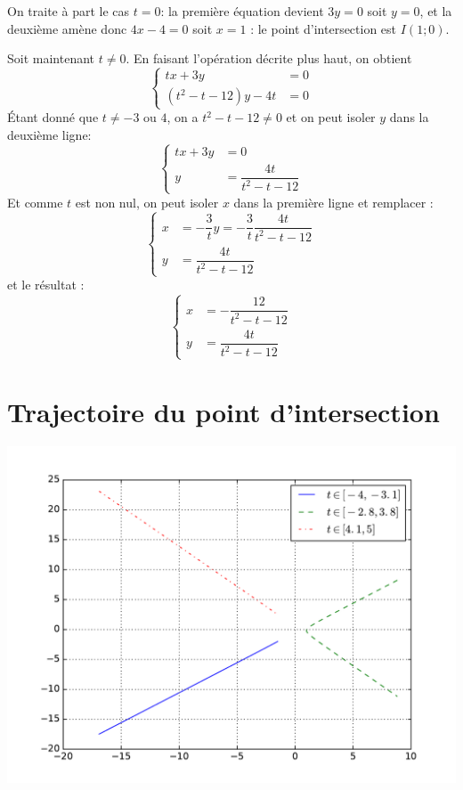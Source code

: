 \documentclass{article}
\theoremstyle{definition}
\begin{document}
\begin{enumerate}[label=\arabic*., listparindent=1.5em, labelsep=2em, itemindent=1.5em]
On traite à part le cas $t=0$: la première équation devient $3y=0$ soit $y=0$, et la deuxième amène donc $4x-4=0$ soit $x=1$ : le point d'intersection est $I(1;0)$.

Soit maintenant $t\neq 0$. En faisant l'opération décrite plus haut, on obtient
	\[\left\{\begin{array}{lc}
    tx+3y &= 0 \\
    (t^2-t-12)y-4t &= 0
    \end{array}\right.
    \]
	Étant donné que $t\neq -3\textrm{ ou }4$, on a $t^2-t-12\neq 0$ et on peut isoler $y$ dans la deuxième ligne:
    \[\left\{\begin{array}{lc}
    tx+3y &= 0 \\
    y &= \dfrac{4t}{t^2-t-12}
    \end{array}\right.
    \]
    Et comme $t$ est non nul, on peut isoler $x$ dans la première ligne et remplacer :
    \[\left\{
    \begin{array}{lc}
    x &= -\dfrac{3}{t}y = -\dfrac{3}{t}\dfrac{4t}{t^2-t-12}\\
    y &= \dfrac{4t}{t^2-t-12}
    \end{array}\right.
    \]
et le résultat :
	\[\boxed{
    \left\{
    \begin{array}{lc}
    x &= -\dfrac{12}{t^2-t-12} \\
    y &= \dfrac{4t}{t^2-t-12}
    \end{array}
    \right.
    }
    \]
\end{enumerate}
%
%
%

\section*{Trajectoire du point d'intersection}

\includegraphics[width=\textwidth]{graphe.pdf}
\end{document}
